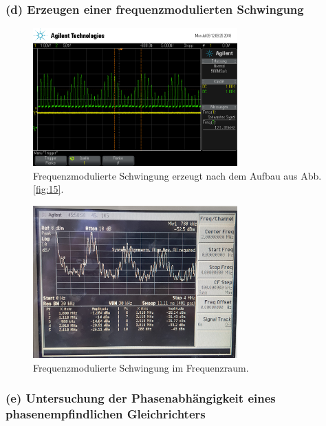 \subsubsection{(d) Erzeugen einer frequenzmodulierten Schwingung}
\label{subsubsec:auswertung_d}

\begin{figure}
  \centering
  \includegraphics[width=0.7\textwidth]{osci/amp_diode.png}
  \caption{Frequenzmodulierte
  Schwingung erzeugt nach dem Aufbau aus Abb.\ref{fig:15}.}
  \label{fig:frequ_zeit}
\end{figure}


\begin{figure}
  \centering
  \includegraphics[width=0.7\textwidth]{spec/frequenzmodulation_bereich_fresh_cool.jpg}
  \caption{Frequenzmodulierte
Schwingung im Frequenzraum.}
\label{fig:diode_frequenz_gross}
\end{figure}




\subsubsection{(e) Untersuchung der Phasenabhängigkeit eines
phasenempfindlichen Gleichrichters}
\label{subsubsec:auswertung_e}


